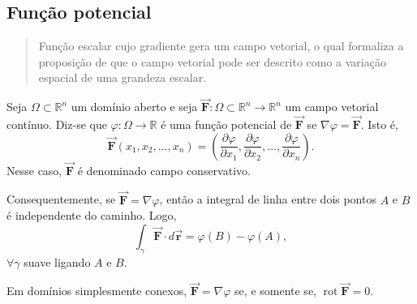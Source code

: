 \documentclass[11pt]{article}
\theoremstyle{definition}
\begin{document}
	\subsection{Função potencial}
	\begin{quote}
		Função escalar cujo gradiente gera um campo vetorial, o qual formaliza a proposição de que o campo vetorial pode ser descrito como a variação espacial de uma grandeza escalar.
	\end{quote}
	Seja $\Omega \subset \mathbb{R}^n$ um domínio aberto e seja $\vec{\boldsymbol{F}}:\Omega\subset \mathbb{R}^n \to \mathbb{R}^n$ um campo vetorial contínuo. Diz-se que $\varphi:\Omega\to \mathbb{R}$ é uma função potencial de $\vec{\boldsymbol{F}}$ se $\nabla \varphi=\vec{\boldsymbol{F}}$. Isto é,
	\begin{equation*}
		\vec{\boldsymbol{F}}(x_1,x_2,\dots,x_n)=\left(\frac{\partial \varphi}{\partial x_1},\frac{\partial \varphi}{\partial x_2},\dots,\frac{\partial \varphi}{\partial x_n}\right).
	\end{equation*}
	Nesse caso, $\vec{\boldsymbol{F}}$ é denominado campo conservativo.
	
	Consequentemente, se $\vec{\boldsymbol{F}}=\nabla \varphi$, então a integral de linha entre dois pontos $A$ e $B$ é independente do caminho. Logo,
	\begin{equation*}
		\int_{\gamma}\vec{\boldsymbol{F}}\cdot d\vec{\boldsymbol{r}}=\varphi(B)-\varphi(A),
	\end{equation*}
	$\forall\gamma$ suave ligando $A$ e $B$.
	
	Em domínios simplesmente conexos, $\vec{\boldsymbol{F}}=\nabla \varphi$ se, e somente se, $\operatorname{rot} \vec{\boldsymbol{F}}=0$.
	
\end{document}

